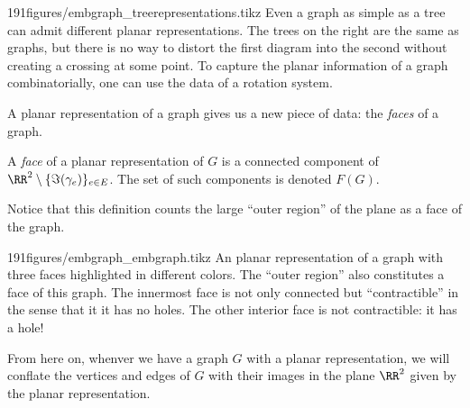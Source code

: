 \begin{examplefigureenv}{191figures/embgraph_treerepresentations.tikz}	Even a graph as simple as a tree can admit different planar representations. The trees on the right are the same as graphs, but there is no way to distort the first diagram into the second without creating a crossing at some point. To capture the planar information of a graph combinatorially, one can use the data of a rotation system.
\end{examplefigureenv}
A planar representation of a graph gives us a new piece of data: the \emph{faces} of a graph. 
\begin{definition} A \emph{face} of a planar representation of $G$ is a connected component of $\RR^2\setminus \{\Im(\gamma_e)\}_{e\in E}$.  The set of such components is denoted $F(G)$. 
\end{definition}
 Notice that this definition counts the large ``outer region'' of the plane as a face of the graph. 
 \begin{examplefigureenv}{191figures/embgraph_embgraph.tikz}
  An planar representation of a graph with three faces highlighted in different colors. The ``outer region'' also constitutes a face of this graph. The innermost face is not only connected but ``contractible'' in the sense that it it has no holes. The other interior face is not contractible: it has a hole! 
 \end{examplefigureenv}
  From here on, whenver we have a graph $G$ with a planar representation, we will conflate the vertices and edges of $G$ with their images in the plane $\RR^2$ given by the planar representation.
